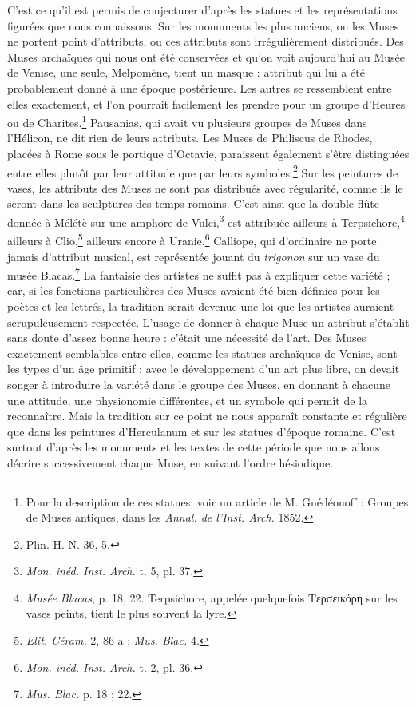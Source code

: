 \documentclass[a4paper, 11pt, oneside, polutonikogreek, french]{article}
\begin{document}
C'est ce qu'il est permis de conjecturer d'après les statues et les représentations figurées que nous connaissons. Sur les monuments les plus anciens, ou les Muses ne portent point d'attributs, ou ces attributs sont irrégulièrement distribués. Des Muses archaïques qui nous ont été conservées et qu'on voit aujourd'hui au Musée de Venise, une seule, Melpomène, tient un masque : attribut qui lui a été probablement donné à une époque postérieure. Les autres se ressemblent entre elles exactement, et l'on pourrait facilement les prendre pour un groupe d'Heures ou de Charites.\footnote{Pour la description de ces statues, voir un article de M. Guédéonoff : Groupes de Muses antiques, dans les \emph{Annal. de l'Inst. Arch.} 1852.} Pausanias, qui avait vu plusieurs groupes de Muses dans l'Hélicon, ne dit rien de leurs attributs. Les Muses de Philiscus de Rhodes, placées à Rome sous le portique d'Octavie, paraissent également s'être distinguées entre elles plutôt par leur attitude que par leurs symboles.\footnote{Plin. H. N. 36, 5.} Sur les peintures de vases, les attributs des Muses ne sont pas distribués avec régularité, comme ils le seront dans les sculptures des temps romains. C'est ainsi que la double flûte donnée à Mélétè sur une amphore de Vulci,\footnote{\emph{Mon. inéd. Inst. Arch.} t. 5, pl. 37.} est attribuée ailleurs à Terpsichore,\footnote{\emph{Musée Blacas}, p. 18, 22. Terpsichore, appelée quelquefois Τερσεικόρη sur les vases peints, tient le plus souvent la lyre.} ailleurs à Clio,\footnote{\emph{Elit. Céram.} 2, 86 a ; \emph{Mus. Blac.} 4.} ailleurs encore à Uranie.\footnote{\emph{Mon. inéd. Inst. Arch.} t. 2, pl. 36.} Calliope, qui d'ordinaire ne porte jamais d'attribut musical, est représentée jouant du \emph{trigonon} sur un vase du musée Blacas.\footnote{\emph{Mus. Blac.} p. 18 ; 22.} La fantaisie des artistes ne suffit pas à expliquer cette variété ; car, si les fonctions particulières des Muses avaient été bien définies pour les poètes et les lettrés, la tradition serait devenue une loi que les artistes auraient scrupuleusement respectée. L'usage de donner à chaque Muse un attribut s'établit sans doute d'assez bonne heure : c'était une nécessité de l'art. Des Muses exactement semblables entre elles, comme les statues archaïques de Venise, sont les types d'un âge primitif : avec le développement d'un art plus libre, on devait songer à introduire la variété dans le groupe des Muses, en donnant à chacune une attitude, une physionomie différentes, et un symbole qui permît de la reconnaître. Mais la tradition sur ce point ne nous apparaît constante et régulière que dans les peintures d'Herculanum et sur les statues d'époque romaine. C'est surtout d'après les monuments et les textes de cette période que nous allons décrire successivement chaque Muse, en suivant l'ordre hésiodique.
\end{document}
